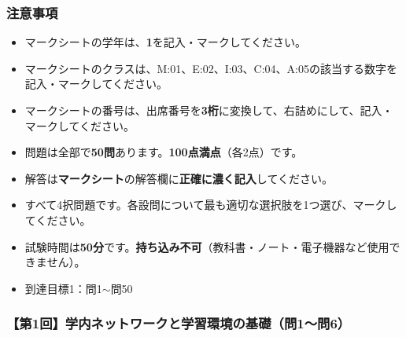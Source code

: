 \documentclass[b4paper,7pt,twocolumn,landscape]{jsarticle}
\begin{document}

\subsubsection*{注意事項}
{
\begin{itemize}
  \item マークシートの学年は、\textbf{1}を記入・マークしてください。
  \item マークシートのクラスは、M:01、E:02、I:03、C:04、A:05の該当する数字を記入・マークしてください。
  \item マークシートの番号は、出席番号を\textbf{3桁}に変換して、右詰めにして、記入・マークしてください。
  \item 問題は全部で\textbf{50問}あります。\textbf{100点満点}（各2点）です。
  \item 解答は\textbf{マークシート}の解答欄に\textbf{正確に濃く記入}してください。
  \item すべて4択問題です。各設問について最も適切な選択肢を1つ選び、マークしてください。
  \item 試験時間は\textbf{50分}です。\textbf{持ち込み不可}（教科書・ノート・電子機器など使用できません）。
  \item 到達目標1：問1$\sim$問50
\end{itemize}
}

\subsubsection*{【第1回】学内ネットワークと学習環境の基礎（問1〜問6）}
\end{document}
